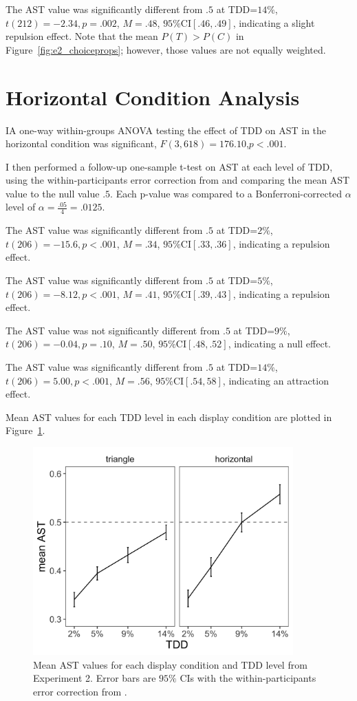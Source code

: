 The AST value was significantly different from $.5$ at TDD=$14\%$, $\textit{t}(212)=-2.34,\textit{p}=.002$, $\textit{M}=.48$, $95\%\text{CI}[.46,.49]$, indicating a slight repulsion effect. Note that the mean $P(T)>P(C)$ in Figure~\ref{fig:e2_choiceprops}; however, those values are not equally weighted.

\section{Horizontal Condition Analysis}
IA one-way within-groups ANOVA testing the effect of TDD on AST in the horizontal condition was significant, $\textit{F}(3,618)=176.10$,$\textit{p}<.001$. 

I then performed a follow-up one-sample t-test on AST at each level of TDD, using the within-participants error correction from \textcite{cousineau2014error} and comparing the mean AST value to the null value $.5$. Each p-value was compared to a Bonferroni-corrected $\alpha$ level of $\alpha=\frac{.05}{4}=.0125$. 

The AST value was significantly different from $.5$ at TDD=$2\%$, $\textit{t}(206)=-15.6,\textit{p}<.001$, $\textit{M}=.34$, $95\%\text{CI}[.33,.36]$, indicating a repulsion effect. 

The AST value was significantly different from $.5$ at TDD=$5\%$, $\textit{t}(206)=-8.12,\textit{p}<.001$, $\textit{M}=.41$, $95\%\text{CI}[.39,.43]$, indicating a repulsion effect. 

The AST value was not significantly different from $.5$ at TDD=$9\%$, $\textit{t}(206)=-0.04,\textit{p}=.10$, $\textit{M}=.50$, $95\%\text{CI}[.48,.52]$, indicating a null effect. 

The AST value was significantly different from $.5$ at TDD=$14\%$, $\textit{t}(206)=5.00,\textit{p}<.001$, $\textit{M}=.56$, $95\%\text{CI}[.54,58]$, indicating an attraction effect. 

Mean AST values for each TDD level in each display condition are plotted in Figure~\ref{fig:e2_ast}.

\begin{figure}
   \includegraphics[width=100mm]{figures/choicePhase_mean_ast.jpeg}
   \caption{Mean AST values for each display condition and TDD level from Experiment 2. Error bars are $95\%$ CIs with the within-participants error correction from \textcite{cousineau2014error}.}
   \label{fig:e2_ast}
\end{figure}

